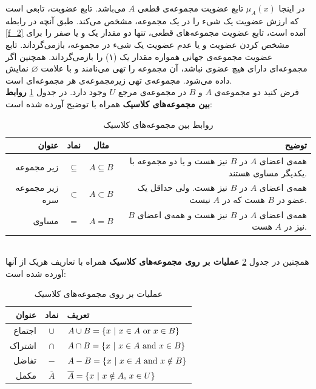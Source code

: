 \documentclass[12pt,a4paper]{article}
\theoremstyle{definition}
\begin{document}
در اینجا
$\mu_{A}(x)$
 تابع عضویت مجموعه‌ی قطعی $A$ می‌باشد. تابع عضویت، تابعی است که ارزش عضویت یک شیء را در یک مجموعه، مشخص می‌کند. طبق آنچه در رابطه
 \ref{f_2}
 آمده است، تابع عضویت مجموعه‌های قطعی، تنها دو مقدار یک و یا صفر را برای مشخص کردن عضویت و یا عدم عضویت یک شیء در مجموعه، بازمی‌گرداند. تابع عضویت مجموعه‌ی جهانی همواره مقدار یک (۱) را بازمی‌گرداند. همچنین اگر مجموعه‌ای دارای هیچ عضوی نباشد، آن مجموعه‌ را تهی
 می‌نامند و با علامت $\varnothing$ نمایش داده می‌شود. مجموعه‌ی تهی زیرمجموعه‌ی هر مجموعه‌ای است.
 \cite{Lee2005}
 \\
فرض کنید دو مجموعه‌ی $ A $ و $ B  $ در مجموعه‌ی مرجع $ U $ وجود دارد.  در جدول   
\ref{table:t_1}
\textbf{روابط بین مجموعه‌های کلاسیک} 
 همراه با توضیح آورده شده است:
\begin{table}[!htbp]
\begin{center}
	{\footnotesize
 \begin{tabular}{r c c r} \hline
عنوان & نماد &  مثال & توضیح  
\\\hline 
زیر مجموعه  &
$\subseteq$ &
$A \subseteq B$ &
همه‌ی اعضای $A$ در $B$ نیز هست و یا دو مجموعه با یکدیگر مساوی هستند.
\\
زیر مجموعه سره &
$\subset$ &
 $A \subset B$ &
همه‌ی اعضای $A$ در $B$ نیز هست. ولی حداقل یک عضو در $B$ هست که در $A$ نیست.
\\
مساوی &
$=$ &
$A = B$ &
همه‌ی اعضای $A$ در $B$ نیز هست و همه‌ی اعضای $B$ نیز در $A$ هست.
\\\hline
 \end{tabular}
 \caption{روابط بین مجموعه‌های کلاسیک}
 \label{table:t_1}
}
\end{center}
\end{table}
\\
همچنین در جدول
\ref{table:t_2}
\textbf{عملیات بر روی مجموعه‌های کلاسیک} 
همراه با تعاریف هریک از آنها آورده شده‌ است:
\begin{table}[!htbp]
	{\footnotesize
	\begin{center}
		\begin{tabular}{r c l} \hline
			عنوان & نماد & تعریف  
			\\\hline 
			اجتماع   &
			$\cup$ &
			$A \cup B = \{x\ |\ x \in A\ {\rm or}\ x \in B \}$ 
			\\
			اشتراک   &
			$\cap$ &
			$A \cap B = \{x\ |\ x \in A\ {\rm and}\ x \in B \}$ 
			\\
			تفاضل &
			$-$ &
			$A - B = \{x\ |\ x \in A\ {\rm and}\ x \notin B \}$ 
		   \\
			مکمل &
			$\overline{A}$ &
			$\overline{A} = \{x\ |\ x \notin A{\rm ,}\ x \in U \}$ 
			\\\hline 
		\end{tabular}
		\caption{عملیات بر روی مجموعه‌های کلاسیک}
		\label{table:t_2}
\end{center}
	}
\end{table} 
\\
\end{document}
